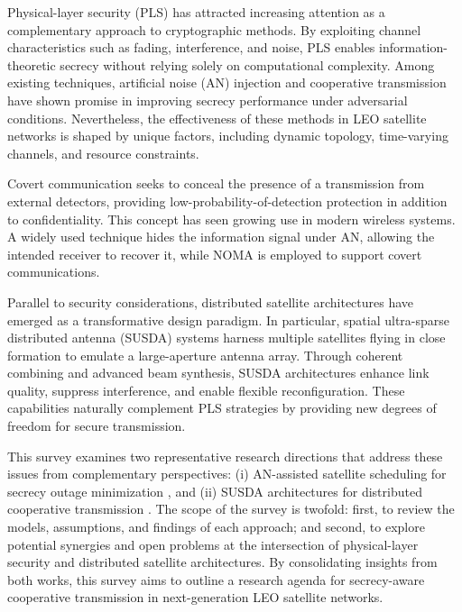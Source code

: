 \documentclass[conference]{IEEEtran}
\begin{document}
Physical-layer security (PLS) has attracted increasing attention as a complementary approach to cryptographic methods. By exploiting channel characteristics such as fading, interference, and noise, PLS enables information-theoretic secrecy without relying solely on computational complexity\cite{PDevi:25}. Among existing techniques, artificial noise (AN) injection and cooperative transmission have shown promise in improving secrecy performance under adversarial conditions\cite{SGoel:08}. Nevertheless, the effectiveness of these methods in LEO satellite networks is shaped by unique factors, including dynamic topology, time-varying channels, and resource constraints.


Covert communication seeks to conceal the presence of a transmission from external detectors, providing low-probability-of-detection protection in addition to confidentiality. This concept has seen growing use in modern wireless systems\cite{SHasan:24}. A widely used technique hides the information signal under AN, allowing the intended receiver to recover it, while NOMA is employed to support covert communications\cite{Chen:23}.

Parallel to security considerations, distributed satellite architectures have emerged as a transformative design paradigm. In particular, spatial ultra-sparse distributed antenna (SUSDA) systems harness multiple satellites flying in close formation to emulate a large-aperture antenna array. Through coherent combining and advanced beam synthesis, SUSDA architectures enhance link quality, suppress interference, and enable flexible reconfiguration\cite{YHe:25}. These capabilities naturally complement PLS strategies by providing new degrees of freedom for secure transmission.

This survey examines two representative research directions that address these issues from complementary perspectives: (i) AN-assisted satellite scheduling for secrecy outage minimization \cite{YLee:25}, and (ii) SUSDA architectures for distributed cooperative transmission \cite{YHe:24}. The scope of the survey is twofold: first, to review the models, assumptions, and findings of each approach; and second, to explore potential synergies and open problems at the intersection of physical-layer security and distributed satellite architectures. By consolidating insights from both works, this survey aims to outline a research agenda for secrecy-aware cooperative transmission in next-generation LEO satellite networks.


\end{document}

